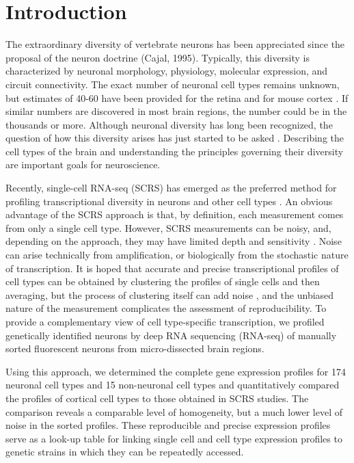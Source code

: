 \section*{Introduction}


The extraordinary diversity of vertebrate neurons has been appreciated since the proposal of the neuron doctrine (Cajal, 1995). Typically, this diversity is characterized by neuronal morphology, physiology, molecular expression, and circuit connectivity. The exact number of neuronal cell types remains unknown, but estimates of 40-60 have been provided for the retina \cite{Macosko_2015 ; Masland_2004} and for mouse cortex \cite{Tasic_2016 ; Zeisel_2015}. If similar numbers are discovered in most brain regions, the number could be in the thousands or more. Although neuronal diversity has long been recognized, the question of how this diversity arises has just started to be asked \cite{Arendt_2008 ; Muotri_2006}. Describing the cell types of the brain and understanding the principles governing their diversity are important goals for neuroscience.

Recently, single-cell RNA-seq (SCRS) has emerged as the preferred method for profiling transcriptional diversity in neurons and other cell types \cite{Shapiro_2013}. An obvious advantage of the SCRS approach is that, by definition, each measurement comes from only a single cell type. However, SCRS measurements can be noisy, and, depending on the approach, they may have limited depth and sensitivity \cite{Parekh_2016 ; Svensson_2017}. Noise can arise technically from amplification, or biologically from the stochastic nature of transcription. It is hoped that accurate and precise transcriptional profiles of cell types can be obtained by clustering the profiles of single cells and then averaging, but the process of clustering itself can add noise \cite{Ntranos_2016}, and the unbiased nature of the measurement complicates the assessment of reproducibility. To provide a complementary view of cell type-specific transcription, we profiled genetically identified neurons \cite{Gong_2003 ; Shima_2016} by deep RNA sequencing (RNA-seq) of manually sorted fluorescent neurons from micro-dissected brain regions.  

Using this approach, we determined the complete gene expression profiles for 174 neuronal cell types and 15 non-neuronal cell types and quantitatively compared the profiles of cortical cell types to those obtained in SCRS studies. The comparison reveals a comparable level of homogeneity, but a much lower level of noise in the sorted profiles. These reproducible and precise expression profiles serve as a look-up table for linking single cell and cell type expression profiles to genetic strains in which they can be repeatedly accessed. 

